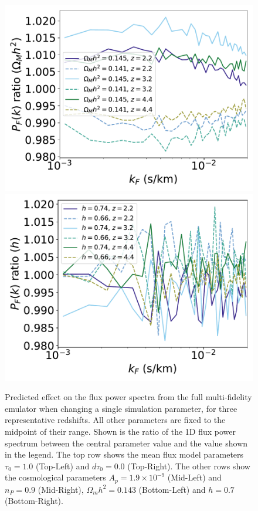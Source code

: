 \documentclass[a4paper,11pt]{article}
\begin{document}
\begin{figure}
    \includegraphics[width=0.48\columnwidth]{figures/single_param_omegamh2.pdf}
    	\includegraphics[width=0.48\columnwidth]{figures/single_param_hub.pdf}
    \caption{Predicted effect on the flux power spectra from the full multi-fidelity emulator when changing a single simulation parameter, for three representative redshifts. All other parameters are fixed to the midpoint of their range. Shown is the ratio of the 1D flux power spectrum between the central parameter value and the value shown in the legend. The top row shows the mean flux model parameters $\tau_0 = 1.0$ (Top-Left) and $d\tau_0 = 0.0$ (Top-Right). The other rows show the cosmological parameters $A_p = 1.9\times 10^{-9}$ (Mid-Left) and $n_P = 0.9$ (Mid-Right), $\Omega_m h^2 = 0.143$ (Bottom-Left) and $h = 0.7$ (Bottom-Right). }
    \label{fig:Apnsfluxpower}
\end{figure}
\end{document}
